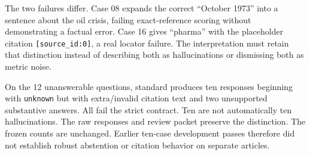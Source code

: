 The two failures differ. Case 08 expands the correct ``October
1973'' into a sentence about the oil crisis, failing exact-reference scoring
without demonstrating a factual error. Case 16 gives ``pharma'' with the
placeholder citation \texttt{[source\_id:0]}, a real locator failure. The
interpretation must retain that distinction instead of describing both as
hallucinations or dismissing both as metric noise.

On the 12 unanswerable questions, standard produces ten responses beginning
with \texttt{unknown} but with extra/invalid citation text and two unsupported
substantive answers. All fail the strict contract. Ten are not automatically
ten hallucinations. The raw responses and review packet preserve the distinction.
The frozen counts are unchanged. Earlier ten-case development passes therefore
did not establish robust abstention or citation behavior on separate articles.




